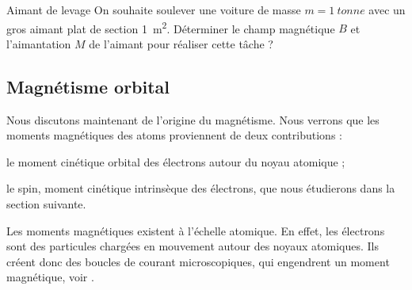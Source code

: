 \documentclass[12pt,fancy]{cours}
\begin{document}


\begin{exemple}{Aimant de levage}
On souhaite soulever une voiture de masse $m=\SI{1}{tonne}$ avec un gros aimant plat de section \SI{1}{m^2}. Déterminer le champ magnétique $B$ et l'aimantation $M$ de l'aimant pour réaliser cette tâche ?

\end{exemple}

\subsection{Magnétisme orbital}
Nous discutons maintenant de l’origine  du magnétisme. Nous verrons que les moments magnétiques des atoms proviennent de deux contributions :
\begin{liste}
  \item le moment cinétique orbital des électrons autour du noyau atomique ;
  \item le spin, moment cinétique intrinsèque des électrons, que nous étudierons dans la section suivante.
\end{liste}


Les moments magnétiques existent à l'échelle atomique. En effet, les électrons sont des particules chargées en mouvement autour des noyaux atomiques. Ils créent donc des boucles de courant microscopiques, qui engendrent un moment magnétique, voir .
\end{document}
